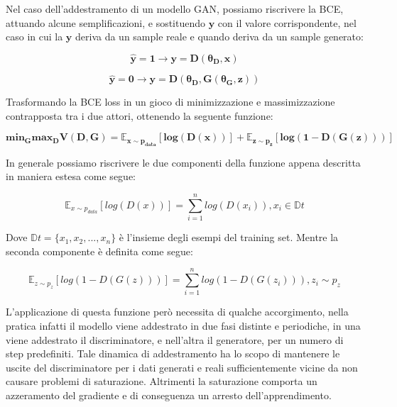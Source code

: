 Nel caso dell'addestramento di un modello GAN, possiamo riscrivere la BCE, attuando alcune semplificazioni, e sostituendo $\mathbf{y}$
con il valore corrispondente, nel caso in cui la $\mathbf{y}$ deriva da un sample reale e quando deriva da un sample generato:

\begin{equation}
    \mathbf{\hat{y} = 1 \rightarrow y = D(\theta_D, x)}
\end{equation}

\begin{equation}
    \mathbf{\hat{y} = 0 \rightarrow y = D(\theta_D, G(\theta_G, z))}
\end{equation}

Trasformando la BCE loss in un gioco di minimizzazione e massimizzazione contrapposta tra i due attori, ottenendo la seguente funzione: 

\begin{equation}
    \mathbf{min_G max_D V(D,G) = \mathbb{E}_{x\sim p_{data}}[log(D(x))] + \mathbb{E}_{z\sim p_{z}}[log(1 - D(G(z)))]}
\end{equation}

In generale possiamo riscrivere le due componenti della funzione appena descritta in maniera estesa come segue:

\begin{equation}
    \mathbb{E}_{x\sim p_{data}}[log(D(x))] = \sum_{i=1}^{n} log(D(x_i)), x_i \in \mathbb{D}t
\end{equation}

Dove $\mathbb{D}t = \{x_1, x_2, ..., x_n\}$ è l'insieme degli esempi del training set. Mentre la seconda componente è definita come segue:

\begin{equation}
    \mathbb{E}_{z\sim p_{z}}[log(1 - D(G(z)))] = \sum_{i=1}^{n} log(1 - D(G(z_i))), z_i \sim p_{z}
\end{equation}

L'applicazione di questa funzione però necessita di qualche accorgimento, nella pratica infatti il modello viene addestrato in due fasi distinte e periodiche,
in una viene addestrato il discriminatore, e nell'altra il generatore, per un numero di step predefiniti. 
Tale dinamica di addestramento ha lo scopo di mantenere le uscite
del discriminatore per i dati generati e reali sufficientemente vicine da non causare problemi di saturazione.
Altrimenti la saturazione comporta un azzeramento del gradiente e di conseguenza un arresto dell'apprendimento.

